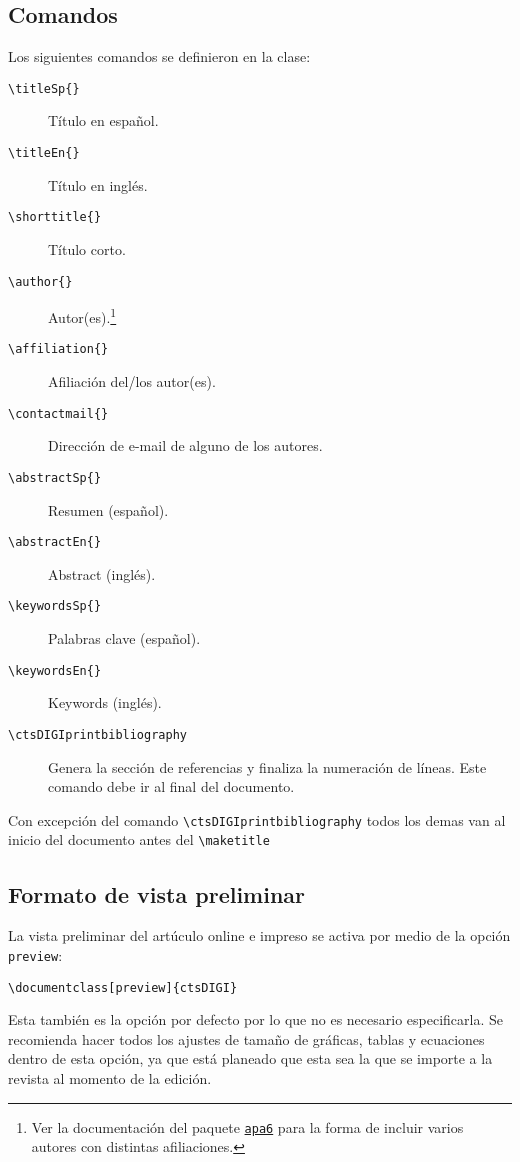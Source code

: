 \documentclass{article}
\begin{document}
\subsection{Comandos}
Los siguientes comandos se definieron en la clase:
\begin{description}
\item [\texttt{\textbackslash titleSp\{\}}] Título en español.
\item [\texttt{\textbackslash titleEn\{\}}] Título en inglés.
\item [\texttt{\textbackslash shorttitle\{\}}] Título corto.
\item [\texttt{\textbackslash author\{\}}] Autor(es).\footnote{Ver la documentación del paquete \href{https://www.ctan.org/pkg/apa6}{\texttt{apa6}} para la forma de incluir varios autores con distintas afiliaciones.}
\item [\texttt{\textbackslash affiliation\{\}}] Afiliación del/los autor(es).\footnotemark[\value{footnote}]
\item [\texttt{\textbackslash contactmail\{\}}] Dirección de e-mail de alguno de los autores.
\item [\texttt{\textbackslash abstractSp\{\}}] Resumen (español).
\item [\texttt{\textbackslash abstractEn\{\}}] Abstract (inglés).
\item [\texttt{\textbackslash keywordsSp\{\}}] Palabras clave (español).
\item [\texttt{\textbackslash keywordsEn\{\}}] Keywords (inglés).
\item [\texttt{\textbackslash ctsDIGIprintbibliography}] Genera la sección de referencias y finaliza la numeración de líneas. Este comando debe ir al final del documento.
\end{description}
Con excepción del comando \texttt{\textbackslash ctsDIGIprintbibliography} todos los demas van al inicio del documento antes del \texttt{\textbackslash maketitle}


\subsection{Formato de vista preliminar}
La vista preliminar del artúculo online e impreso se activa por medio de la opción \texttt{preview}:
\begin{verbatim}
\documentclass[preview]{ctsDIGI}
\end{verbatim}

Esta también es la opción por defecto por lo que no es necesario especificarla. Se recomienda hacer todos los ajustes de tamaño de gráficas, tablas y ecuaciones dentro de esta opción, ya que está planeado que esta sea la que se importe a la revista al momento de la edición.
\end{document}
